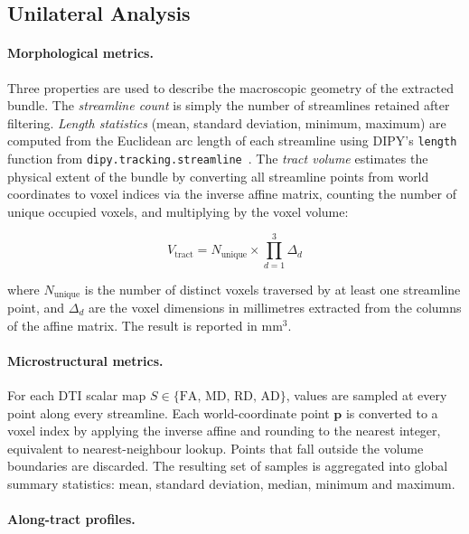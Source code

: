 \subsection{Unilateral Analysis}
\label{subsec:methods_unilateral}

\paragraph{Morphological metrics.}

Three properties are used to describe the macroscopic geometry of the extracted bundle. The \emph{streamline count} is simply the number of streamlines retained after filtering. \emph{Length statistics} (mean, standard deviation, minimum, maximum) are computed from the Euclidean arc length of each streamline using DIPY's \texttt{length} function from \texttt{dipy.tracking.streamline}~\cite{garyfallidis_dipy_2014}. The \emph{tract volume} estimates the physical extent of the bundle by converting all streamline points from world coordinates to voxel indices via the inverse affine matrix, counting the number of unique occupied voxels, and multiplying by the voxel volume:

\begin{equation}
	V_{\text{tract}} = N_{\text{unique}} \times \prod_{d=1}^{3} \Delta_d
	\label{eq:tract_volume}
\end{equation}

where $N_{\text{unique}}$ is the number of distinct voxels traversed by at least one streamline point, and $\Delta_d$ are the voxel dimensions in millimetres extracted from the columns of the affine matrix. The result is reported in mm$^3$.

\paragraph{Microstructural metrics.}

For each DTI scalar map $S \in \{\text{FA},\, \text{MD},\, \text{RD},\, \text{AD}\}$, values are sampled at every point along every streamline. Each world-coordinate point $\mathbf{p}$ is converted to a voxel index by applying the inverse affine and rounding to the nearest integer, equivalent to nearest-neighbour lookup. Points that fall outside the volume boundaries are discarded. The resulting set of samples is aggregated into global summary statistics: mean, standard deviation, median, minimum and maximum.

\paragraph{Along-tract profiles.}

